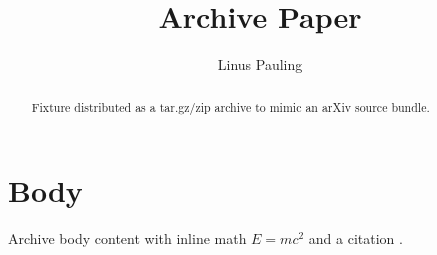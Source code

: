 \documentclass{article}
\title{Archive Paper}
\author{Linus Pauling}
\begin{document}
\maketitle
\begin{abstract}
Fixture distributed as a tar.gz/zip archive to mimic an arXiv source bundle.
\end{abstract}
\section{Body}
Archive body content with inline math $E = mc^2$ and a citation \cite{einstein}.


\end{document}
